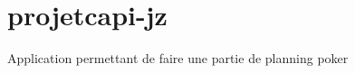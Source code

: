 \chapter{projetcapi-\/jz}
\hypertarget{md__r_e_a_d_m_e}{}\label{md__r_e_a_d_m_e}
\label{md__r_e_a_d_m_e_autotoc_md0}%
%


Application permettant de faire une partie de planning poker 